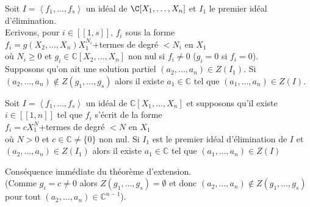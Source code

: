 \begin{thm}[d'extension]

 Soit $I=\left \langle f_1,\ldots,f_s \right\rangle$ un idéal de $\C[X_1,\ldots,X_n]$ et $I_1$ le premier idéal d'élimination.\\
Ecrivons, pour $i \in [\![1,s]\!]$, $f_i$ sous la forme \\
$f_i=g(X_2,\ldots,X_n)X_1^{N_i}$+termes de degré $<N_i$ en $X_1$\\
où $N_i \geq 0$ et $g_i \in \mathbb{C}[X_2,\ldots,X_n]$ non nul si $f_i \neq 0$ ($g_i=0$ si $f_i=0$). \\
Supposons qu'on ait une solution partiel $(a_2,\ldots,a_n) \in Z(I_1)$. Si $(a_2,\ldots,a_n) \notin Z(g_1,\ldots,g_s)$ alors il existe $a_1 \in \mathbb{C}$ tel que $(a_1,\ldots,a_n) \in Z(I)$.
\end{thm}

\begin{Cor}

 Soit $I=\left \langle f_1,\ldots,f_s \right\rangle$ un idéal de $\mathbb{C}[X_1,\ldots,X_n]$ et supposons qu'il existe $i \in [\![1,n]\!]$ tel que $f_i$ s'écrit de la forme \\
$f_i=cX_1^{N}$+termes de degré $<N$ en $X_1$\\
où $N> 0$ et $c \in \mathbb{C}\neq \{0\}$ non nul. Si $I_1$ est le premier idéal d'élimination de $I$ et $(a_2,\ldots,a_n) \in Z(I_1)$ alors il existe $a_1 \in \mathbb{C}$ tel que $(a_1,\ldots,a_n) \in Z(I)$
\end{Cor}

\begin{demo}
Conséquence immédiate du théorème d'extension.\\
(Comme $g_i=c \neq 0$ alors $Z(g_1,\ldots,g_s) = \emptyset$ et donc $(a_2,\ldots,a_n) \notin Z(g_1,\ldots,g_s)$ pour tout $(a_2,\ldots,a_n) \in \mathbb{C}^{n-1}$).
\end{demo}